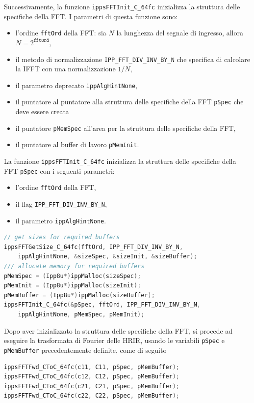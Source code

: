 \documentclass[12pt,a4paper,titlepage]{article}
\begin{document}
Successivamente, la funzione \texttt{ippsFFTInit\_C\_64fc} inizializza la struttura delle specifiche della FFT. I parametri di questa funzione sono:
\begin{itemize}
\item l'ordine \texttt{fftOrd} della FFT: sia $N$ la lunghezza del segnale di ingresso, allora $N = 2^{ \texttt{fftOrd}}$,
\item il metodo di normalizzazione \texttt{IPP\_FFT\_DIV\_INV\_BY\_N} che specifica di calcolare la IFFT con una normalizzazione $1/N$,
\item il parametro deprecato \texttt{ippAlgHintNone},
\item il puntatore al puntatore alla struttura delle specifiche della FFT \texttt{pSpec} che deve essere creata
\item il puntatore \texttt{pMemSpec} all'area per la struttura delle specifiche della FFT,
\item il puntatore al buffer di lavoro \texttt{pMemInit}.
\end{itemize}
La funzione \texttt{ippsFFTInit\_C\_64fc} inizializza la struttura delle specifiche della FFT \texttt{pSpec} con i seguenti parametri:
\begin{itemize}
\item l'ordine \texttt{fftOrd} della FFT,
\item il flag  \texttt{IPP\_FFT\_DIV\_INV\_BY\_N}, 
\item il parametro \texttt{ippAlgHintNone}.
\end{itemize}

\begin{lstlisting}[language=cpp, label=code:inizializzazione_fft, caption = Inizializzazione FFT, breaklines = false, captionpos = b]
// get sizes for required buffers
ippsFFTGetSize_C_64fc(fftOrd, IPP_FFT_DIV_INV_BY_N, 
	ippAlgHintNone, &sizeSpec, &sizeInit, &sizeBuffer);
/// allocate memory for required buffers
pMemSpec = (Ipp8u*)ippMalloc(sizeSpec);
pMemInit = (Ipp8u*)ippMalloc(sizeInit);
pMemBuffer = (Ipp8u*)ippMalloc(sizeBuffer);
ippsFFTInit_C_64fc(&pSpec, fftOrd, IPP_FFT_DIV_INV_BY_N, 
	ippAlgHintNone, pMemSpec, pMemInit);
\end{lstlisting}

Dopo aver inizializzato la struttura delle specifiche della FFT, si procede ad eseguire la trasformata di Fourier delle HRIR, usando le variabili \texttt{pSpec} e \texttt{pMemBuffer} precedentemente definite, come di seguito

\begin{lstlisting}[language=cpp, label=code:fft_hrir_c, caption = FFT delle HRIR, breaklines = false, captionpos = b]
ippsFFTFwd_CToC_64fc(c11, C11, pSpec, pMemBuffer);
ippsFFTFwd_CToC_64fc(c12, C12, pSpec, pMemBuffer);
ippsFFTFwd_CToC_64fc(c21, C21, pSpec, pMemBuffer);
ippsFFTFwd_CToC_64fc(c22, C22, pSpec, pMemBuffer);
\end{lstlisting}
\end{document}
